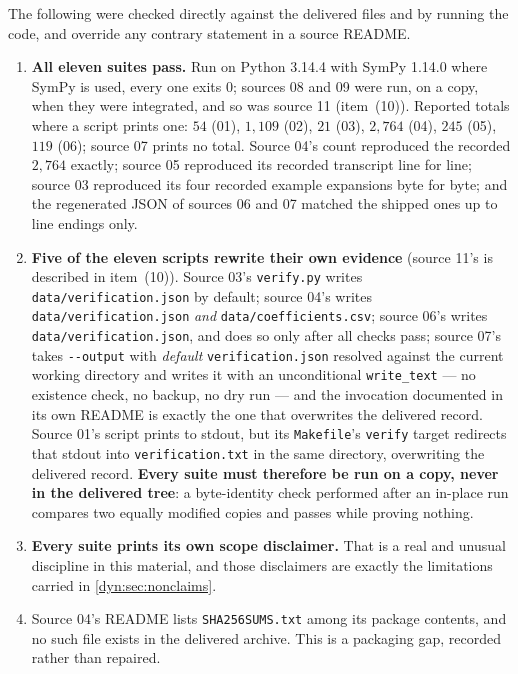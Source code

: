 \documentclass[11pt,letterpaper]{article}
\theoremstyle{definition}
\theoremstyle{remark}
\numberwithin{equation}{section}
\begin{document}
The following were checked directly against the delivered files and by
running the code, and override any contrary statement in a source README.

\begin{enumerate}[label=(\arabic*)]
\item \textbf{All eleven suites pass.} Run on Python 3.14.4 with SymPy 1.14.0
where SymPy is used, every one exits $0$; sources 08 and 09 were run, on a
copy, when they were integrated, and so was source 11 (item~(10)). Reported totals where a script
prints one: $54$ (01), $1{,}109$ (02), $21$ (03), $2{,}764$ (04), $245$
(05), $119$ (06); source 07 prints no total. Source 04's count reproduced
the recorded $2{,}764$ exactly; source 05 reproduced its recorded
transcript line for line; source 03 reproduced its four recorded example
expansions byte for byte; and the regenerated JSON of sources 06 and 07
matched the shipped ones up to line endings only.
\item \textbf{Five of the eleven scripts rewrite their own evidence}
(source 11's is described in item~(10)). Source
03's \texttt{verify.py} writes \texttt{data/verification.json} by default;
source 04's writes \texttt{data/verification.json} \emph{and}
\texttt{data/coefficients.csv}; source 06's writes
\texttt{data/verification.json}, and does so only after all checks pass;
source 07's takes \texttt{-{}-output} with \emph{default}
\texttt{verification.json} resolved against the current working directory
and writes it with an unconditional \texttt{write\_text} --- no existence
check, no backup, no dry run --- and the invocation documented in its own
README is exactly the one that overwrites the delivered record.
Source 01's script prints to stdout, but its \texttt{Makefile}'s
\texttt{verify} target redirects that stdout into
\texttt{verification.txt} in the same directory, overwriting the delivered
record. \textbf{Every suite must therefore be run on a copy, never in the
delivered tree}: a byte-identity check performed after an in-place run
compares two equally modified copies and passes while proving nothing.
\item \textbf{Every suite prints its own scope disclaimer.} That is a real
and unusual discipline in this material, and those disclaimers are exactly
the limitations carried in \cref{dyn:sec:nonclaims}.
\item Source 04's README lists \texttt{SHA256SUMS.txt} among its package
contents, and no such file exists in the delivered archive. This is a
packaging gap, recorded rather than repaired.

\end{enumerate}
\end{document}
